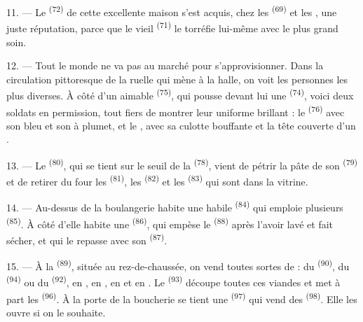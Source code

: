 11. --- Le  \textsuperscript{(72)} de cette excellente maison s'est
acquis, chez les  \textsuperscript{(69)} et les
, une juste réputation, parce que le vieil
 \textsuperscript{(71)} le torréfie lui-même avec le plus grand
soin.

\VUsaut{4.0mm}
\VUsaut{3.0mm}

12. --- Tout le monde ne va pas au marché pour s'approvisionner. Dans la
circulation pittoresque de la ruelle qui mène à la halle, on voit les personnes
les plus diverses. À côté d'un aimable 
\textsuperscript{(75)}, qui pousse devant lui une 
\textsuperscript{(74)}, voici deux soldats en permission, tout fiers de montrer
leur uniforme brillant : le  \textsuperscript{(76)} avec son
 bleu et son  à plumet, et le , avec sa culotte bouffante et la tête couverte d'un .

13. --- Le  \textsuperscript{(80)}, qui se tient sur le seuil
de la  \textsuperscript{(78)}, vient de pétrir la pâte de son
 \textsuperscript{(79)} et de retirer du four les
 \textsuperscript{(81)}, les 
\textsuperscript{(82)} et les  \textsuperscript{(83)} qui
sont dans la vitrine.

14. --- Au-dessus de la boulangerie habite une habile 
\textsuperscript{(84)} qui emploie plusieurs 
\textsuperscript{(85)}. À côté d'elle habite une 
\textsuperscript{(86)}, qui empèse le  \textsuperscript{(88)} après
l'avoir lavé et fait sécher, et qui le repasse avec son 
\textsuperscript{(87)}.

\VUsaut{4.0mm}
\VUsaut{3.0mm}

15. --- À la  \textsuperscript{(89)}, située au
rez-de-chaussée, on vend toutes sortes de  : du
 \textsuperscript{(90)}, du  \textsuperscript{(94)}
ou du  \textsuperscript{(92)}, en , en
, en  et en . Le
 \textsuperscript{(93)} découpe toutes ces viandes et met
à part les  \textsuperscript{(96)}. À la porte de la
boucherie se tient une  \textsuperscript{(97)} qui
vend des  \textsuperscript{(98)}. Elle les ouvre si on le
souhaite.

